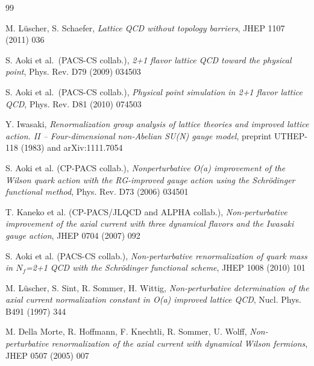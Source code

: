 \begin{thebibliography}{99}

M. L\"uscher, S. Schaefer,
{\it Lattice QCD without topology barriers},
JHEP 1107 (2011) 036



S. Aoki et al.~(PACS-CS collab.), 
{\it 2+1 flavor lattice QCD toward the physical point},
Phys. Rev. D79 (2009) 034503

S. Aoki et al.~(PACS-CS collab.),
{\it Physical point simulation in 2+1 flavor lattice QCD},
Phys. Rev. D81 (2010) 074503



Y. Iwasaki,
{\it Renormalization group analysis of lattice theories and
improved lattice action. II -- Four-dimensional non-Abelian SU(N) gauge model},
preprint UTHEP-118 (1983) and arXiv:1111.7054



S. Aoki et al. (CP-PACS collab.),
{\it Nonperturbative O(a) improvement of the Wilson quark action with the 
RG-improved gauge action using the Schr\"odinger functional method},
Phys. Rev. D73 (2006) 034501

T. Kaneko et al. (CP-PACS/JLQCD and ALPHA collab.),
{\it Non-perturbative improvement of the axial current with 
three dynamical flavors and the Iwasaki gauge action},
JHEP 0704 (2007) 092



S. Aoki et al. (PACS-CS collab.),
{\it Non-perturbative renormalization of quark mass 
in $N_f$=2+1 QCD with the Schr\"odinger functional scheme},
JHEP 1008 (2010) 101



M. L\"uscher, S. Sint, R. Sommer, H. Wittig,
{\it Non-perturbative determination of the axial current 
normalization constant in O(a) improved lattice QCD},
Nucl. Phys. B491 (1997) 344

M. Della Morte, R. Hoffmann, F. Knechtli, R. Sommer, U. Wolff,
{\it Non-pertur\-ba\-tive renormalization of the axial current 
with dynamical Wilson fermions},
JHEP 0507 (2005) 007





\end{thebibliography}
